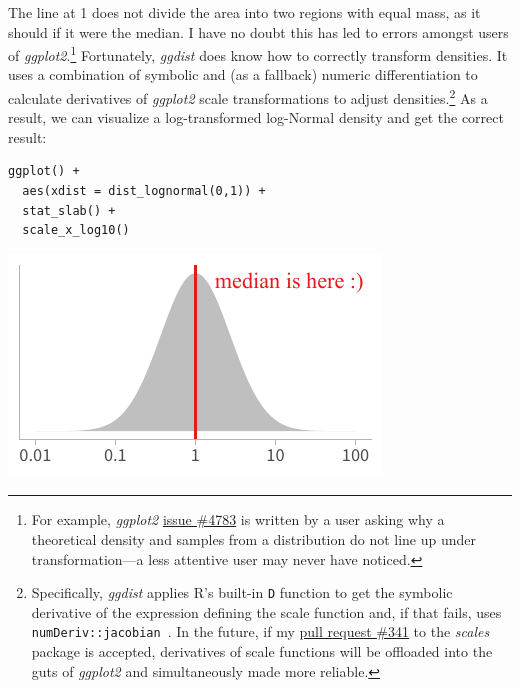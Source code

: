 \documentclass[journal]{vgtc}                     %
\begin{document}
The line at 1 does not divide the area into two regions with equal mass, as it should if it were the median. I have no doubt this has led to errors amongst users of \textit{ggplot2}.\footnote{For example, \textit{ggplot2} \href{https://github.com/tidyverse/ggplot2/issues/4783}{issue \#4783} is written by a user asking why a theoretical density and samples from a distribution do not line up under transformation---a less attentive user may never have noticed.} Fortunately, \textit{ggdist} does know how to correctly transform densities. It uses a combination of symbolic and (as a fallback) numeric differentiation to calculate derivatives of \textit{ggplot2} scale transformations to adjust densities.\footnote{Specifically, \textit{ggdist} applies R's built-in \texttt{D} function to get the symbolic derivative of the expression defining the scale function and, if that fails, uses \texttt{numDeriv::jacobian}~\cite{gilbert2016numderiv}. In the future, if my \href{https://github.com/r-lib/scales/pull/341}{pull request \#341} to the \textit{scales} package is accepted, derivatives of scale functions will be offloaded into the guts of \textit{ggplot2} and simultaneously made more reliable.} As a result, we can visualize a log-transformed log-Normal density and get the correct result:

\noindent
\begin{minipage}{.5\columnwidth}
\small
\begin{verbatim}
ggplot() +
  aes(xdist = dist_lognormal(0,1)) +
  stat_slab() +
  scale_x_log10()
\end{verbatim}
\end{minipage}%
  \begin{minipage}{.4\columnwidth}
    \centering
    \includegraphics[width=1.2\columnwidth]{figs/3-jacobian-correct.pdf}
  \end{minipage}
\hfill\break
\end{document}
